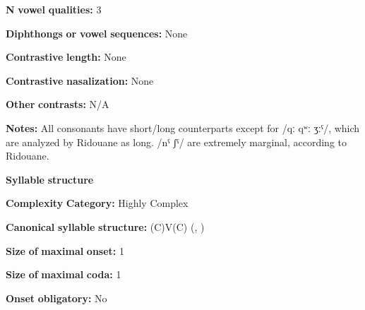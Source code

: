 \begin{styleBody}
\textbf{N} \textbf{vowel} \textbf{qualities:} 3
\end{styleBody}

\begin{styleBody}
\textbf{Diphthongs} \textbf{or} \textbf{vowel} \textbf{sequences:} None
\end{styleBody}

\begin{styleBody}
\textbf{Contrastive} \textbf{length:} None
\end{styleBody}

\begin{styleBody}
\textbf{Contrastive} \textbf{nasalization:} None
\end{styleBody}

\begin{styleBody}
\textbf{Other} \textbf{contrasts:} N/A
\end{styleBody}

\begin{styleBody}
\textbf{Notes:} All consonants have short/long counterparts except for /qː qʷː ʒːˤ/, which are analyzed by Ridouane as long. /nˤ ʃˤ/ are extremely marginal, according to Ridouane.
\end{styleBody}

\begin{styleBody}
\textbf{Syllable} \textbf{structure}
\end{styleBody}

\begin{styleBody}
\textbf{Complexity} \textbf{Category:} Highly Complex
\end{styleBody}

\begin{styleBody}
\textbf{Canonical} \textbf{syllable} \textbf{structure:} (C)V(C) (\citealt{DellElmedlouai2002}, \citealt{Ridouane2008})
\end{styleBody}

\begin{styleBody}
\textbf{Size} \textbf{of} \textbf{maximal} \textbf{onset:} 1
\end{styleBody}

\begin{styleBody}
\textbf{Size} \textbf{of} \textbf{maximal} \textbf{coda:} 1
\end{styleBody}

\begin{styleBody}
\textbf{Onset} \textbf{obligatory:} No
\end{styleBody}

